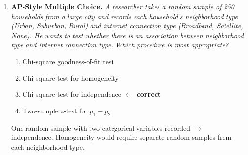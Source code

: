 \documentclass[10pt]{article}
\begin{document}
\begin{enumerate}
      \begin{enumerate}[label=\alph*.]
        \item \textbf{State:} Procedure: \\
              $H_0$:  \quad $H_a$: 
        \item \textbf{Plan:} Verify conditions (use numbers):
              \begin{itemize}
                \item Random: 
                \item 10\%: 
                \item Large Counts: 
              \end{itemize}
      \end{enumerate}

\vspace{0.10in}

\item \textbf{AP-Style Multiple Choice.} \;
      \textit{A researcher takes a random sample of 250 households from a large city and records
      each household's neighborhood type (Urban, Suburban, Rural) and internet connection type
      (Broadband, Satellite, None). He wants to test whether there is an association between
      neighborhood type and internet connection type. Which procedure is most appropriate?}

      \begin{enumerate}[label=(\Alph*)]
        \item Chi-square goodness-of-fit test
        \item Chi-square test for homogeneity
        \item Chi-square test for independence \textcolor{keyred}{\textbf{$\leftarrow$ correct}}
        \item Two-sample $z$-test for $p_1 - p_2$
      \end{enumerate}

\begin{teachernote}
One random sample with two categorical variables recorded $\to$ independence. Homogeneity would require separate random samples from each neighborhood type.
\end{teachernote}


\end{enumerate}
\end{document}
